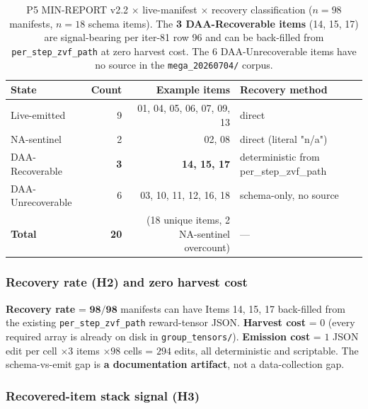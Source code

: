 \documentclass{article}  \usepackage[preprint,nonatbib]{neurips_2026} \usepackage[numbers]{natbib}
\begin{document}
\begin{table}[ht]
\centering
\small
\caption{P5 MIN-REPORT v2.2 $\times$ live-manifest $\times$ recovery
classification ($n{=}98$ manifests, $n{=}18$ schema items). The
\textbf{3 DAA-Recoverable items} (14, 15, 17) are signal-bearing per
iter-81 row 96 and can be back-filled from \texttt{per\_step\_zvf\_path}
at zero harvest cost. The $6$ DAA-Unrecoverable items have no source in
the \texttt{mega\_20260704/} corpus.}
\label{tab:p5-iter113-emit-gap}
\begin{tabular}{l r r l}
\toprule
State & Count & Example items & Recovery method \\
\midrule
Live-emitted       & 9 & 01, 04, 05, 06, 07, 09, 13 & direct \\
NA-sentinel        & 2 & 02, 08                    & direct (literal "n/a") \\
DAA-Recoverable    & \textbf{3} & \textbf{14, 15, 17}   & deterministic from per\_step\_zvf\_path \\
DAA-Unrecoverable  & 6 & 03, 10, 11, 12, 16, 18    & schema-only, no source \\
\midrule
\textbf{Total}     & \textbf{20} & (18 unique items, 2 NA-sentinel overcount) & --- \\
\bottomrule
\end{tabular}
\end{table}

\subsubsection{Recovery rate (H2) and zero harvest cost}

\textbf{Recovery rate} = $\mathbf{98/98}$ manifests can have Items 14,
15, 17 back-filled from the existing \texttt{per\_step\_zvf\_path}
reward-tensor JSON. \textbf{Harvest cost} = $0$ (every required array
is already on disk in \texttt{group\_tensors/}).
\textbf{Emission cost} = $1$ JSON edit per cell $\times 3$ items $\times
98$ cells = $294$ edits, all deterministic and scriptable. The
schema-vs-emit gap is \textbf{a documentation artifact}, not a
data-collection gap.

\subsubsection{Recovered-item stack signal (H3)}
\end{document}
